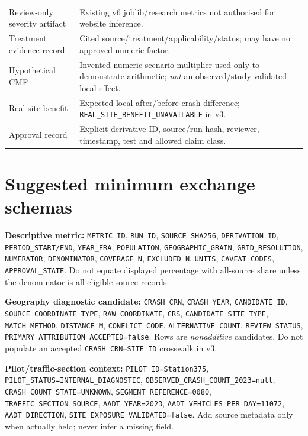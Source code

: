 \documentclass[11pt,a4paper,openany]{report}
\newcommand{\pathcode}[1]{\nolinkurl{#1}}
\begin{document}
\begin{longtable}{@{}L{43mm}L{99mm}@{}}
Review-only severity artifact & Existing v6 joblib/research metrics not authorised for website inference.\\
Treatment evidence record & Cited source/treatment/applicability/status; may have no approved numeric factor.\\
Hypothetical CMF & Invented numeric scenario multiplier used only to demonstrate arithmetic; \emph{not} an observed/study-validated local effect.\\
Real-site benefit & Expected local after/before crash difference; \pathcode{REAL_SITE_BENEFIT_UNAVAILABLE} in v3.\\
Approval record & Explicit derivative ID, source/run hash, reviewer, timestamp, test and allowed claim class.\\
\bottomrule\end{longtable}
\normalsize

\section{Suggested minimum exchange schemas}
\textbf{Descriptive metric:} \pathcode{METRIC_ID}, \pathcode{RUN_ID}, \pathcode{SOURCE_SHA256}, \pathcode{DERIVATION_ID}, \pathcode{PERIOD_START/END}, \pathcode{YEAR_ERA}, \pathcode{POPULATION}, \pathcode{GEOGRAPHIC_GRAIN}, \pathcode{GRID_RESOLUTION}, \pathcode{NUMERATOR}, \pathcode{DENOMINATOR}, \pathcode{COVERAGE_N}, \pathcode{EXCLUDED_N}, \pathcode{UNITS}, \pathcode{CAVEAT_CODES}, \pathcode{APPROVAL_STATE}. Do not equate displayed percentage with all-source share unless the denominator is all eligible source records.

\textbf{Geography diagnostic candidate:} \pathcode{CRASH_CRN}, \pathcode{CRASH_YEAR}, \pathcode{CANDIDATE_ID}, \pathcode{SOURCE_COORDINATE_TYPE}, \pathcode{RAW_COORDINATE}, \pathcode{CRS}, \pathcode{CANDIDATE_SITE_TYPE}, \pathcode{MATCH_METHOD}, \pathcode{DISTANCE_M}, \pathcode{CONFLICT_CODE}, \pathcode{ALTERNATIVE_COUNT}, \pathcode{REVIEW_STATUS}, \pathcode{PRIMARY_ATTRIBUTION_ACCEPTED=false}. Rows are \emph{nonadditive} candidates. Do not populate an accepted \pathcode{CRASH_CRN}--\pathcode{SITE_ID} crosswalk in v3.

\textbf{Pilot/traffic-section context:} \pathcode{PILOT_ID=Station375}, \pathcode{PILOT_STATUS=INTERNAL_DIAGNOSTIC}, \pathcode{OBSERVED_CRASH_COUNT_2023=null}, \pathcode{CRASH_COUNT_STATE=UNKNOWN}, \pathcode{SEGMENT_REFERENCE=0080}, \pathcode{TRAFFIC_SECTION_SOURCE}, \pathcode{AADT_YEAR=2023}, \pathcode{AADT_VEHICLES_PER_DAY=11072}, \pathcode{AADT_DIRECTION}, \pathcode{SITE_EXPOSURE_VALIDATED=false}. Add source metadata only when actually held; never infer a missing field.
\end{document}
